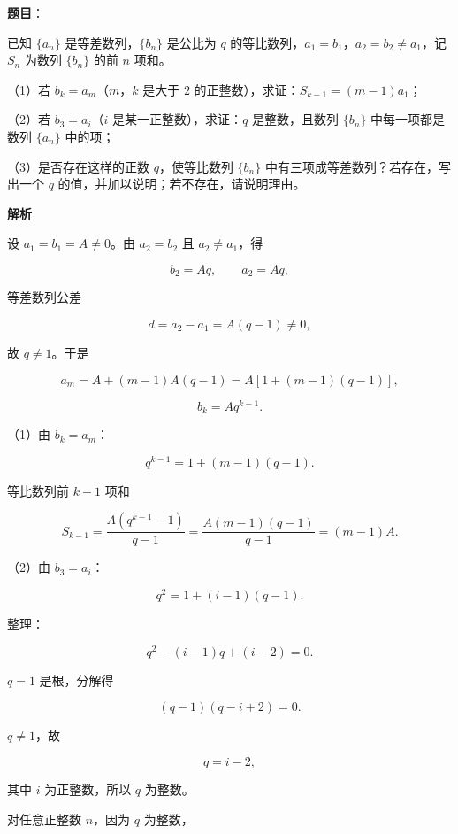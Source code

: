 \begin{answer}

\textbf{题目}：

已知 $\{a_n\}$ 是等差数列，$\{b_n\}$ 是公比为 $q$ 的等比数列，$a_1=b_1$，$a_2=b_2\neq a_1$，记 $S_n$ 为数列 $\{b_n\}$ 的前 $n$ 项和。

（1）若 $b_k=a_m$（$m$，$k$ 是大于 $2$ 的正整数），求证：$S_{k-1}=(m-1)a_1$；

（2）若 $b_3=a_i$（$i$ 是某一正整数），求证：$q$ 是整数，且数列 $\{b_n\}$ 中每一项都是数列 $\{a_n\}$ 中的项；

（3）是否存在这样的正数 $q$，使等比数列 $\{b_n\}$ 中有三项成等差数列？若存在，写出一个 $q$ 的值，并加以说明；若不存在，请说明理由。

\textbf{解析}

设 $a_1=b_1=A\neq0$。由 $a_2=b_2$ 且 $a_2\neq a_1$，得

\nopagebreak[4]
\[b_2=Aq,\qquad a_2=Aq,\]

等差数列公差

\nopagebreak[4]
\[d=a_2-a_1=A(q-1)\neq0,\]

故 $q\neq1$。于是

\nopagebreak[4]
\[a_m=A+(m-1)A(q-1)=A[1+(m-1)(q-1)],\]

\nopagebreak[4]
\[b_k=Aq^{k-1}.\]

（1）由 $b_k=a_m$：

\nopagebreak[4]
\[q^{k-1}=1+(m-1)(q-1).\]

等比数列前 $k-1$ 项和

\nopagebreak[4]
\[S_{k-1}=\frac{A(q^{k-1}-1)}{q-1}=\frac{A(m-1)(q-1)}{q-1}=(m-1)A.\]

（2）由 $b_3=a_i$：

\nopagebreak[4]
\[q^2=1+(i-1)(q-1).\]

整理：

\nopagebreak[4]
\[q^2-(i-1)q+(i-2)=0.\]

$q=1$ 是根，分解得

\nopagebreak[4]
\[(q-1)(q-i+2)=0.\]

$q\neq1$，故

\nopagebreak[4]
\[q=i-2,\]

其中 $i$ 为正整数，所以 $q$ 为整数。

对任意正整数 $n$，因为 $q$ 为整数，


\end{answer}
